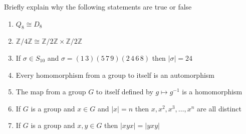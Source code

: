 \documentclass[12 pt, letterpaper]{hmcpset}
\begin{document}
\begin{problem}[5.]
	Briefly explain why the following statements are true or false
	\begin{enumerate}
		\item $Q_{8} \cong D_{8}$
		\item $\mathbb{Z} / 4 \mathbb{Z} \cong \mathbb{Z}/2\mathbb{Z} \times \mathbb{Z}/2\mathbb{Z}$
		\item If $\sigma \in S_{10}$ and $\sigma = (1 \, 3)(5 \, 7 \, 9)(2 \, 4 \, 6 \, 8)$ then $\vert \sigma \vert = 24$
		\item Every homomorphism from a group to itself is an automorphism
		\item The map from a group $G$ to itself defined by $g \mapsto g^{-1}$ is a homomorphism
		\item If $G$ is a group and $x \in G$ and $\vert x \vert = n$ then $x, x^{2}, x^{3}, \dots, x^{n}$ are all distinct
		\item If $G$ is a group and $x, y \in G$ then $\vert xyx \vert = \vert yxy \vert$
	\end{enumerate}
\end{problem}
\end{document}
